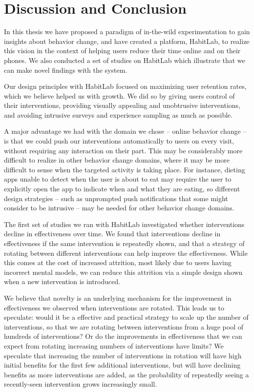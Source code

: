 \chapter{Discussion and Conclusion}

In this thesis we have proposed a paradigm of in-the-wild experimentation to gain insights about behavior change, and have created a platform, HabitLab, to realize this vision in the context of helping users reduce their time online and on their phones. We also conducted a set of studies on HabitLab which illustrate that we can make novel findings with the system.

Our design principles with HabitLab focused on maximizing user retention rates, which we believe helped us with growth. We did so by giving users control of their interventions, providing visually appealing and unobtrusive interventions, and avoiding intrusive surveys and experience sampling as much as possible.

A major advantage we had with the domain we chose -- online behavior change -- is that we could push our interventions automatically to users on every visit, without requiring any interaction on their part. This may be considerably more difficult to realize in other behavior change domains, where it may be more difficult to sense when the targeted activity is taking place. For instance, dieting apps unable to detect when the user is about to eat may require the user to explicitly open the app to indicate when and what they are eating, so different design strategies -- such as unprompted push notifications that some might consider to be intrusive -- may be needed for other behavior change domains.

The first set of studies we ran with HabitLab investigated whether interventions decline in effectiveness over time. We found that interventions decline in effectiveness if the same intervention is repeatedly shown, and that a strategy of rotating between different interventions can help improve the effectiveness. While this comes at the cost of increased attrition, most likely due to users having incorrect mental models, we can reduce this attrition via a simple design shown when a new intervention is introduced.

We believe that novelty is an underlying mechanism for the improvement in effectiveness we observed when interventions are rotated. This leads us to speculate: would it be a effective and practical strategy to scale up the number of interventions, so that we are rotating between interventions from a huge pool of hundreds of interventions? Or do the improvements in effectiveness that we can expect from rotating increasing numbers of interventions have limits? We speculate that increasing the number of interventions in rotation will have high initial benefits for the first few additional interventions, but will have declining benefits as more interventions are added, as the probability of repeatedly seeing a recently-seen intervention grows increasingly small.

